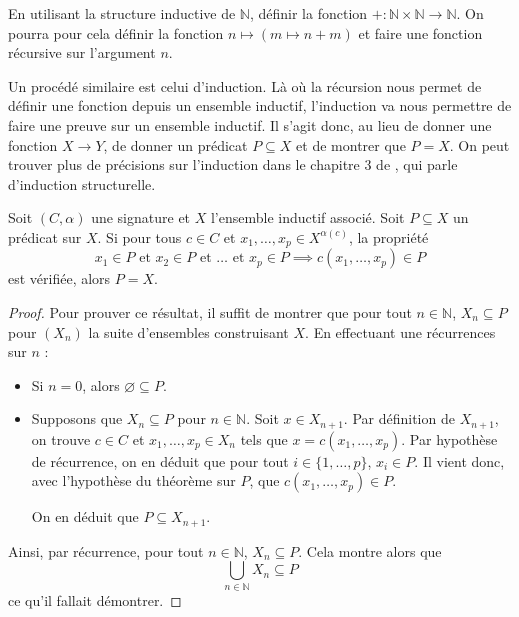 \begin{exercise}
  En utilisant la structure inductive de $\mathbb N$, définir la fonction
  $+ : \mathbb N \times \mathbb N \to \mathbb N$. On pourra pour cela définir
  la fonction $n \mapsto (m \mapsto n + m)$ et faire une fonction récursive sur
  l'argument $n$.
\end{exercise}

Un procédé similaire est celui d'induction. Là où la récursion nous permet de
définir une fonction depuis un ensemble inductif, l'induction va nous permettre
de faire une preuve sur un ensemble inductif. Il s'agit donc, au lieu de donner
une fonction $X \to Y$, de donner un prédicat $P \subseteq X$ et de montrer que
$P = X$. On peut trouver plus de précisions sur l'induction dans le chapitre $3$
de \cite{winskell1996formal}, qui parle d'induction structurelle.

\begin{theorem}
  Soit $(C,\alpha)$ une signature et $X$ l'ensemble inductif associé. Soit
  $P\subseteq X$ un prédicat sur $X$. Si pour tous $c\in C$ et
  $x_1,\ldots,x_p\in X^{\alpha(c)}$, la propriété
  \[x_1\in P \text{ et } x_2\in P \text{ et }\ldots \text{ et }x_p\in P \implies
  c(x_1,\ldots,x_p)\in P\] est vérifiée,
  alors $P = X$.
\end{theorem}

\begin{proof}
  Pour prouver ce résultat, il suffit de montrer que pour tout $n\in\mathbb N$,
  $X_n \subseteq P$ pour $(X_n)$ la suite d'ensembles construisant $X$. En
  effectuant une récurrences sur $n$ :
  \begin{itemize}
  \item Si $n = 0$, alors $\varnothing \subseteq P$.
  \item Supposons que $X_n \subseteq P$ pour $n \in \mathbb N$. Soit
    $x \in X_{n+1}$. Par définition de $X_{n+1}$, on trouve $c \in C$ et
    $x_1,\ldots,x_p \in X_n$ tels que $x = c(x_1,\ldots,x_p)$. Par hypothèse
    de récurrence, on en déduit que pour tout $i\in\{1,\ldots,p\}$, $x_i\in P$.
    Il vient donc, avec l'hypothèse du théorème sur $P$, que
    $c(x_1,\ldots,x_p)\in P$.

    On en déduit que $P\subseteq X_{n+1}$.
  \end{itemize}

  Ainsi, par récurrence, pour tout $n\in \mathbb N$, $X_n \subseteq P$.
  Cela montre alors que
  \[\bigcup_{n \in \mathbb N} X_n \subseteq P\]
  ce qu'il fallait démontrer.
\end{proof}

